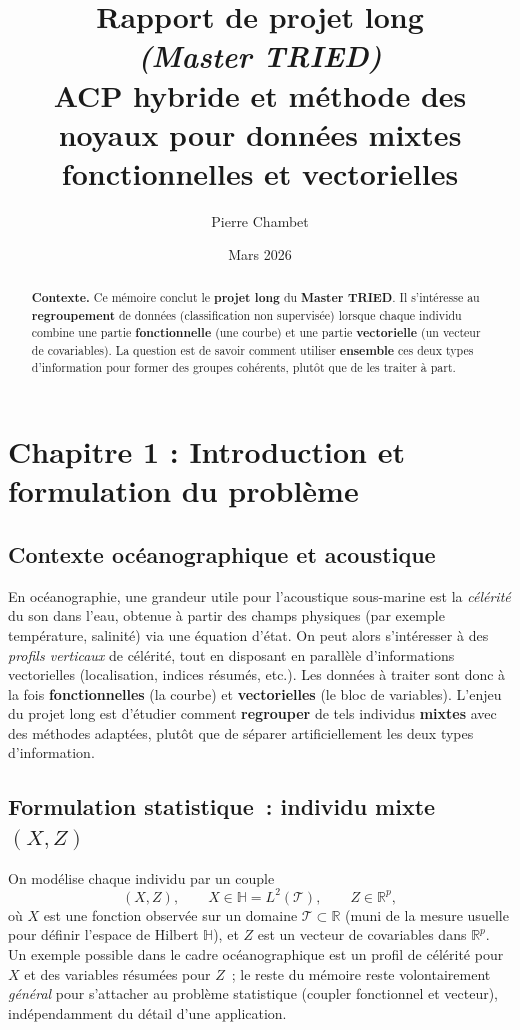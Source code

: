 \documentclass[11pt,a4paper]{article}
\title{%
  \vspace{-0.5cm}
  \textbf{Rapport de projet long}\\[0.3em]
  \small\textit{(Master TRIED)}\\[0.4em]
  \large ACP hybride et méthode des noyaux pour données mixtes\\
  fonctionnelles et vectorielles
}
\author{Pierre Chambet}
\date{Mars 2026}
\newcommand{\Ltwo}{L^2(\mathcal{T})}
\begin{document}
\maketitle
\thispagestyle{fancy}

\begin{abstract}
\noindent
\textbf{Contexte.}
Ce mémoire conclut le \textbf{projet long} du \textbf{Master TRIED}. Il s'intéresse
au \textbf{regroupement} de données (classification non supervisée) lorsque chaque
individu combine une partie \textbf{fonctionnelle} (une courbe) et une partie
\textbf{vectorielle} (un vecteur de covariables). La question est de savoir comment
utiliser \textbf{ensemble} ces deux types d'information pour former des groupes
cohérents, plutôt que de les traiter à part.

\end{abstract}

\vspace{0.75em}
\tableofcontents
\newpage

\section{Chapitre 1 : Introduction et formulation du problème}

\subsection{Contexte océanographique et acoustique}
En océanographie, une grandeur utile pour l'acoustique sous-marine est la
\emph{célérité} du son dans l'eau, obtenue à partir des champs physiques (par
exemple température, salinité) via une équation d'état. On peut alors s'intéresser
à des \emph{profils verticaux} de célérité, tout en disposant en parallèle
d'informations vectorielles (localisation, indices résumés, etc.). Les données
à traiter sont donc à la fois \textbf{fonctionnelles} (la courbe) et
\textbf{vectorielles} (le bloc de variables). L'enjeu du projet long est
d'étudier comment \textbf{regrouper} de tels individus \textbf{mixtes} avec des
méthodes adaptées, plutôt que de séparer artificiellement les deux types
d'information.

\subsection{Formulation statistique~: individu mixte \texorpdfstring{$(X,Z)$}{X,Z}}
On modélise chaque individu par un couple
\[
  (X,Z),\qquad X\in \mathbb{H}=\Ltwo,\qquad Z\in\mathbb{R}^p,
\]
où $X$ est une fonction observée sur un domaine $\mathcal{T}\subset\mathbb{R}$
(muni de la mesure usuelle pour définir l'espace de Hilbert $\mathbb{H}$), et
$Z$ est un vecteur de covariables dans $\mathbb{R}^p$. Un exemple possible
dans le cadre océanographique est un profil de célérité pour $X$ et des
variables résumées pour $Z$~; le reste du mémoire reste volontairement
\emph{général} pour s'attacher au problème statistique (coupler fonctionnel et
vecteur), indépendamment du détail d'une application.
\end{document}
